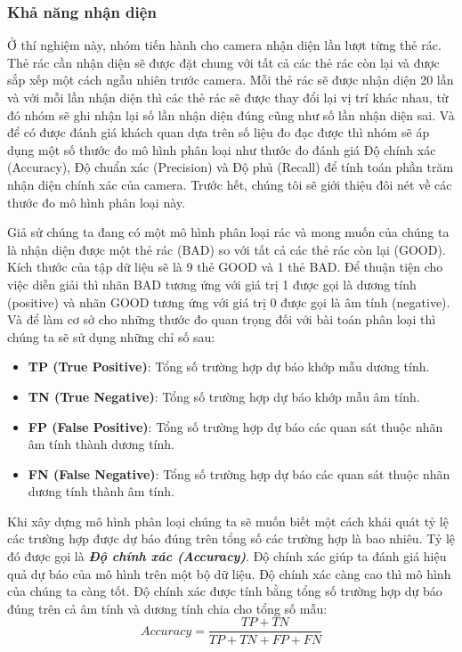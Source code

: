 \subsubsection{Khả năng nhận diện}
Ở thí nghiệm này, nhóm tiến hành cho camera nhận diện lần lượt từng thẻ rác. Thẻ rác cần nhận diện sẽ được đặt chung với tất cả các thẻ rác còn lại và được sắp xếp một cách ngẫu nhiên trước camera. Mỗi thẻ rác sẽ được nhận diện 20 lần và với mỗi lần nhận diện thì các thẻ rác sẽ được thay đổi lại vị trí khác nhau, từ đó nhóm sẽ ghi nhận lại số lần nhận diện đúng cũng như số lần nhận diện sai. Và để có được đánh giá khách quan dựa trên số liệu đo đạc được thì nhóm sẽ áp dụng một số thước đo mô hình phân loại như thước đo đánh giá Độ chính xác (Accuracy), Độ chuẩn xác (Precision) và Độ phủ (Recall) để tính toán phần trăm nhận diện chính xác của camera. Trước hết, chúng tôi sẽ giới thiệu đôi nét về các thước đo mô hình phân loại này.

Giả sử chúng ta đang có một mô hình phân loại rác và mong muốn của chúng ta là nhận diện được một thẻ rác (BAD) so với tất cả các thẻ rác còn lại (GOOD). Kích thước của tập dữ liệu sẽ là 9 thẻ GOOD và 1 thẻ BAD.
Để thuận tiện cho việc diễn giải thì nhãn BAD tương ứng với giá trị 1 được gọi là dương tính (positive) và nhãn GOOD tương ứng với giá trị 0 được gọi là âm tính (negative). Và để làm cơ sở cho những thước đo quan trọng đối với bài toán phân loại thì chúng ta sẽ sử dụng những chỉ số sau:
\begin{itemize}
    \item \textbf{TP (True Positive)}: Tổng số trường hợp dự báo khớp mẫu dương tính.
    \item \textbf{TN (True Negative)}: Tổng số trường hợp dự báo khớp mẫu âm tính.
    \item \textbf{FP (False Positive)}: Tổng số trường hợp dự báo các quan sát thuộc nhãn âm tính thành dương tính.
    \item \textbf{FN (False Negative)}: Tổng số trường hợp dự báo các quan sát thuộc nhãn dương tính thành âm tính.
\end{itemize}

Khi xây dựng mô hình phân loại chúng ta sẽ muốn biết một cách khái quát tỷ lệ các trường hợp được dự báo đúng trên tổng số các trường hợp là bao nhiêu. Tỷ lệ đó được gọi là \textbf{\textit{Độ chính xác (Accuracy)}}. Độ chính xác giúp ta đánh giá hiệu quả dự báo của mô hình trên một bộ dữ liệu. Độ chính xác càng cao thì mô hình của chúng ta càng tốt. Độ chính xác được tính bằng tổng số trường hợp dự báo đúng trên cả âm tính và dương tính chia cho tổng số mẫu:
\begin{equation}
    Accuracy = \frac{TP + TN}{TP + TN + FP + FN}
\end{equation}

